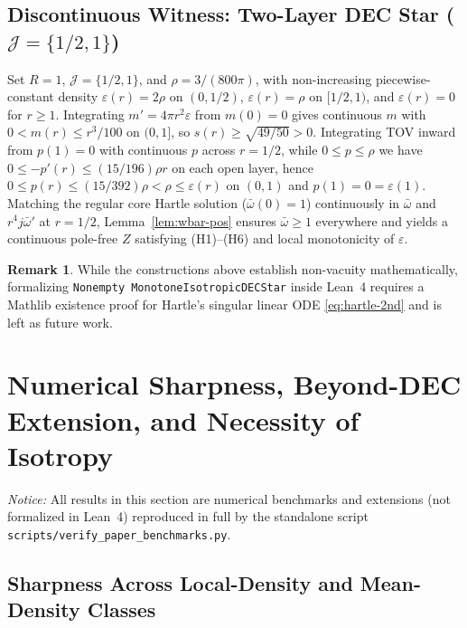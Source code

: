 \documentclass[11pt]{article}
\theoremstyle{plain}
\theoremstyle{definition}
\newtheorem{remark}[theorem]{Remark}
\newcommand{\eps}{\varepsilon}
\newcommand{\wbar}{\bar{\omega}}
\begin{document}
\subsection{Discontinuous Witness: Two-Layer DEC Star (\texorpdfstring{$\mathcal{J} = \{1/2, 1\}$}{J = \{1/2, 1\}})}

Set $R = 1$, $\mathcal{J} = \{1/2, 1\}$, and $\rho = 3/(800\pi)$, with non-increasing piecewise-constant density $\eps(r) = 2\rho$ on $(0, 1/2)$, $\eps(r) = \rho$ on $[1/2, 1)$, and $\eps(r) = 0$ for $r \ge 1$. Integrating $m' = 4\pi r^2 \eps$ from $m(0) = 0$ gives continuous $m$ with $0 < m(r) \le r^3/100$ on $(0, 1]$, so $s(r) \ge \sqrt{49/50} > 0$. Integrating TOV inward from $p(1) = 0$ with continuous $p$ across $r = 1/2$, while $0 \le p \le \rho$ we have $0 \le -p'(r) \le (15/196)\rho r$ on each open layer, hence $0 \le p(r) \le (15/392)\rho < \rho \le \eps(r)$ on $(0, 1)$ and $p(1) = 0 = \eps(1)$. Matching the regular core Hartle solution ($\wbar(0)=1$) continuously in $\wbar$ and $r^4 j \wbar'$ at $r = 1/2$, Lemma~\ref{lem:wbar-pos} ensures $\wbar \ge 1$ everywhere and yields a continuous pole-free $Z$ satisfying (H1)--(H6) and local monotonicity of $\eps$.

\begin{remark}
While the constructions above establish non-vacuity mathematically, formalizing \texttt{Nonempty MonotoneIsotropicDECStar} inside Lean~4 requires a Mathlib existence proof for Hartle's singular linear ODE \eqref{eq:hartle-2nd} and is left as future work.
\end{remark}

\section{Numerical Sharpness, Beyond-DEC Extension, and Necessity of Isotropy}
\label{sec:sharpness}

\emph{Notice:} All results in this section are numerical benchmarks and extensions (not formalized in Lean~4) reproduced in full by the standalone script \texttt{scripts/verify\_paper\_benchmarks.py}.

\subsection{Sharpness Across Local-Density and Mean-Density Classes}
\end{document}

